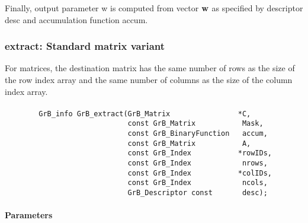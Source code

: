 Finally, output parameter {\sf w} is computed from vector ${\bf w}$ as
specified by descriptor {\sf desc} and accumulation function {\sf accum}.



\subsubsection{{\sf extract}: Standard matrix variant}

For matrices, the destination matrix has
the same number of rows as the size of the row index array and the same
number of columns as the size of the column index array.

\paragraph{\syntax}

\begin{verbatim}                 
        GrB_info GrB_extract(GrB_Matrix                *C,
                             const GrB_Matrix           Mask,
                             const GrB_BinaryFunction   accum,
                             const GrB_Matrix           A,
                             const GrB_Index           *rowIDs,
                             const GrB_Index            nrows,
                             const GrB_Index           *colIDs,
                             const GrB_Index            ncols,
                             GrB_Descriptor const       desc);
\end{verbatim}

\paragraph{Parameters}

